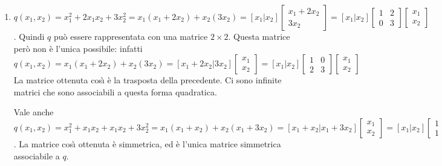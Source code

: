 \documentclass{article}
\begin{document}
\begin{enumerate}
\item $q\left( x_{1},x_{2}\right)
=x_{1}^{2}+2x_{1}x_{2}+3x_{2}^{2}=x_{1}\left( x_{1}+2x_{2}\right)
+x_{2}\left( 3x_{2}\right) =\left[ x_{1}|x_{2}\right] \left[ 
\begin{array}{c}
x_{1}+2x_{2} \\ 
3x_{2}%
\end{array}%
\right] =\left[ x_{1}|x_{2}\right] \left[ 
\begin{array}{cc}
1 & 2 \\ 
0 & 3%
\end{array}%
\right] \left[ 
\begin{array}{c}
x_{1} \\ 
x_{2}%
\end{array}%
\right] $. Quindi $q$ pu\`{o} essere rappresentata con una matrice $2\times
2 $. Questa matrice per\`{o} non \`{e} l'unica possibile: infatti $q\left(
x_{1},x_{2}\right) =x_{1}\left( x_{1}+2x_{2}\right) +x_{2}\left(
3x_{2}\right) =\left[ x_{1}+2x_{2}|3x_{2}\right] \left[ 
\begin{array}{c}
x_{1} \\ 
x_{2}%
\end{array}%
\right] =\left[ x_{1}|x_{2}\right] \left[ 
\begin{array}{cc}
1 & 0 \\ 
2 & 3%
\end{array}%
\right] \left[ 
\begin{array}{c}
x_{1} \\ 
x_{2}%
\end{array}%
\right] $ La matrice ottenuta cos\`{\i} \`{e} la trasposta della precedente.
Ci sono infinite matrici che sono associabili a questa forma quadratica.

Vale anche $q\left( x_{1},x_{2}\right)
=x_{1}^{2}+x_{1}x_{2}+x_{1}x_{2}+3x_{2}^{2}=x_{1}\left( x_{1}+x_{2}\right)
+x_{2}\left( x_{1}+3x_{2}\right) =\left[ x_{1}+x_{2}|x_{1}+3x_{2}\right] %
\left[ 
\begin{array}{c}
x_{1} \\ 
x_{2}%
\end{array}%
\right] =\left[ x_{1}|x_{2}\right] \left[ 
\begin{array}{cc}
1 & 1 \\ 
1 & 3%
\end{array}%
\right] \left[ 
\begin{array}{c}
x_{1} \\ 
x_{2}%
\end{array}%
\right] $. La matrice cos\`{\i} ottenuta \`{e} simmetrica, ed \`{e} l'unica
matrice simmetrica associabile a $q$.
\end{enumerate}
\end{document}
